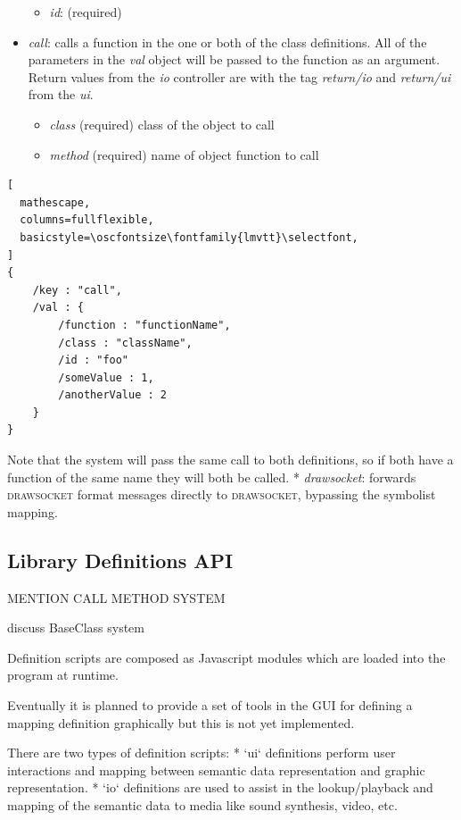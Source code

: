 \documentclass{article}
\def\drawsocket{\textsc{drawsocket}\xspace}
\def\oscfontsize{\footnotesize}
\begin{document}
\begin{itemize}
\begin{itemize}\itemsep0pt 
  \item \textit{id}: (required)
\end{itemize}
\item \textit{call}: calls a function in the one or both of the class definitions. All of the parameters in the \textit{val} object will be passed to the function as an argument. Return values from the \textit{io} controller are with the tag \textit{return/io} and \textit{return/ui} from the \textit{ui}.
\begin{itemize}\itemsep0pt 
  \item \textit{class} (required) class of the object to call
  \item \textit{method} (required) name of object function to call
\end{itemize}

\end{itemize}

\begin{lstlisting}[
  mathescape,
  columns=fullflexible,
  basicstyle=\oscfontsize\fontfamily{lmvtt}\selectfont,
]
{
    /key : "call",
    /val : {
        /function : "functionName",
        /class : "className",
        /id : "foo"
        /someValue : 1,
        /anotherValue : 2
    }
}
\end{lstlisting}

Note that the system will pass the same call to both definitions, so if both have a function of the same name they will both be called.
* \textit{drawsocket}: forwards \drawsocket format messages directly to \drawsocket, bypassing the symbolist mapping.


\subsection{Library Definitions API}\label{subsec:library-definitions_api}

MENTION CALL METHOD SYSTEM	


discuss BaseClass system


Definition scripts are composed as Javascript modules which are loaded into the program at runtime.

Eventually it is planned to provide a set of tools in the GUI for defining a mapping definition graphically but this is not yet implemented.

There are two types of definition scripts:
* `ui` definitions perform user interactions and mapping between semantic data representation and graphic representation.
* `io` definitions are used to assist in the lookup/playback and mapping of the semantic data to media like sound synthesis, video, etc.
\end{document}
